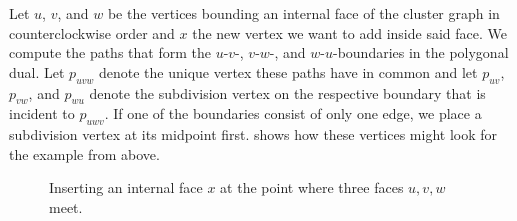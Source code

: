 Let $u$, $v$, and $w$ be the vertices bounding an internal face of the cluster graph in counterclockwise order and $x$ the new vertex we want to add inside said face. We compute the paths that form the $u$-$v$-, $v$-$w$-, and $w$-$u$-boundaries in the polygonal dual. Let $p_{uvw}$ denote the unique vertex these paths have in common and let $p_{uv}$, $p_{vw}$, and $p_{wu}$ denote the subdivision vertex on the respective boundary that is incident to $p_{uwv}$. If one of the boundaries consist of only one edge, we place a subdivision vertex at its midpoint first.  shows how these vertices might look for the example from above.

\begin{figure}[H]
	\centering
	\quad
	\quad
	\caption{Inserting an internal face $x$ at the point where three faces $u,v,w$ meet.}
	\label{fig:insert-vertex-illustration}
\end{figure}

